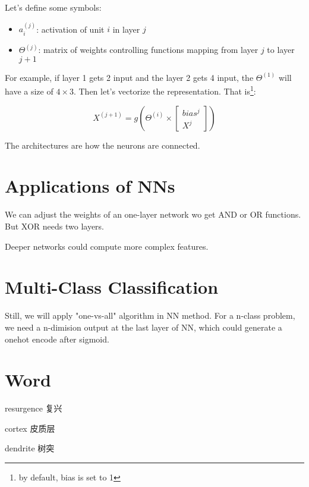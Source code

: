 \documentclass[en,11pt,english,black,simple]{../elegantbook}
\begin{document}
Let's define some symbols:
\begin{itemize}
    \item \(a_i^{(j)}\): activation of unit \(i\) in layer \(j\)
    \item \(\Theta^{(j)}\): matrix of weights controlling functions mapping from layer \(j\) to layer \(j+1\)
\end{itemize}

For example, if layer 1 gets 2 input and the layer 2 gets 4 input, the \(\Theta^{(1)}\) will have a size of \(4 \times 3\). Then let's vectorize the representation. That is\footnote{by default, bias is set to 1}: 

\[X^{(j+1)} = g \left(\Theta^{(i)} \times \left[\begin{aligned}
    bias^j\\
    X^j    
\end{aligned}\right]\right)\]

The architectures are how the neurons are connected.

\section{Applications of NNs}

We can adjust the weights of an one-layer network wo get AND or OR functions. But XOR needs two layers. 

Deeper networks could compute more complex features.

\section{Multi-Class Classification}

Still, we will apply "one-vs-all" algorithm in NN method. For a n-class problem, we need a n-dimision output at the last layer of NN, which could generate a onehot encode after sigmoid.



\section*{Word}

resurgence 复兴

cortex 皮质层

dendrite 树突

\let\chapname\undefined
\ifx\mainclass\undefined
\end{document}

